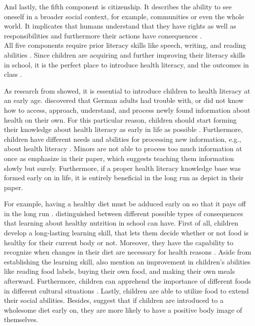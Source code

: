 And lastly, the fifth component is citizenship. It describes the ability to see oneself in a broader social context, for example, communities or even the whole world. It implicates that humans understand that they have rights as well as responsibilities and furthermore their actions have consequences \autocite{paakkari2012health}.\\
All five components require prior literacy skills like speech, writing, and reading abilities \autocite{paakkari2012health}. Since children are acquiring and further improving their literacy skills in school, it is the perfect place to introduce health literacy, and the outcomes in class \autocite{paakkari2012health, velardo2017emphasizing}.

As research from \textcite{jordan2015gesundheitskompetenz, velardo2017emphasizing} showed, it is essential to introduce children to health literacy at an early age. \textcite{jordan2015gesundheitskompetenz} discovered that German adults had trouble with, or did not know how to access, approach, understand, and process newly found information about health on their own.
For this particular reason, children should start forming their knowledge about health literacy as early in life as possible \autocite{jordan2015gesundheitskompetenz, velardo2017emphasizing}. Furthermore, children have different needs and abilities for processing new information, e.g., about health literacy \autocite{velardo2017emphasizing}. Minors are not able to process too much information at once as \textcite{gossen2012search} emphasize in their paper, which suggests teaching them information slowly but surely.
Furthermore, if a proper health literacy knowledge base was formed early on in life, it is entirely beneficial in the long run as \textcite{paakkari2012health, velardo2017emphasizing} depict in their paper. 

For example, having a healthy diet must be adduced early on so that it pays off in the long run \autocite{dudley2015teaching}. \textcite{lawrence2001schools} distinguished between different possible types of consequences that learning about healthy nutrition in school can have. First of all, children develop a long-lasting learning skill, that lets them decide whether or not food is healthy for their current body or not. Moreover, they have the capability to recognize when changes in their diet are necessary for health reasons \autocite{lawrence2001schools}.
Aside from establishing the learning skill, \textcite{lawrence2001schools} also mention an improvement in children's abilities like reading food labels, buying their own food, and making their own meals afterward. Furthermore, children can apprehend the importance of different foods in different cultural situations \autocite{lawrence2001schools}.
Lastly, children are able to utilize food to extend their social abilities. Besides, \textcite{lawrence2001schools} suggest that if children are introduced to a wholesome diet early on, they are more likely to have a positive body image of themselves. 


